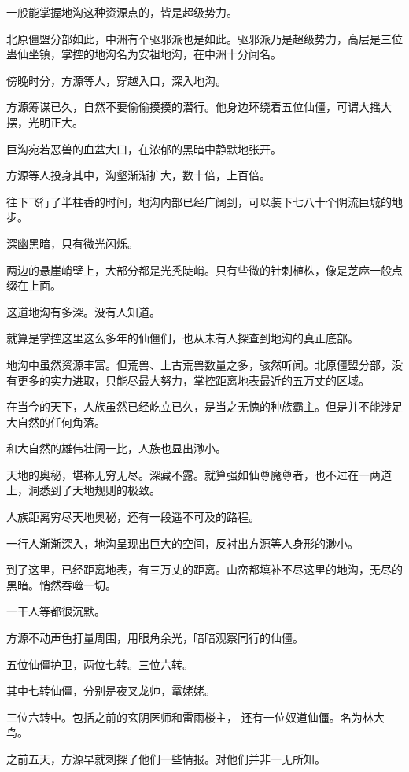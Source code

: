 \begin{this_body}
一般能掌握地沟这种资源点的，皆是超级势力。

北原僵盟分部如此，中洲有个驱邪派也是如此。驱邪派乃是超级势力，高层是三位蛊仙坐镇，掌控的地沟名为安祖地沟，在中洲十分闻名。

傍晚时分，方源等人，穿越入口，深入地沟。

方源筹谋已久，自然不要偷偷摸摸的潜行。他身边环绕着五位仙僵，可谓大摇大摆，光明正大。

巨沟宛若恶兽的血盆大口，在浓郁的黑暗中静默地张开。

方源等人投身其中，沟壑渐渐扩大，数十倍，上百倍。

往下飞行了半柱香的时间，地沟内部已经广阔到，可以装下七八十个阴流巨城的地步。

深幽黑暗，只有微光闪烁。

两边的悬崖峭壁上，大部分都是光秃陡峭。只有些微的针刺植株，像是芝麻一般点缀在上面。

这道地沟有多深。没有人知道。

就算是掌控这里这么多年的仙僵们，也从未有人探查到地沟的真正底部。

地沟中虽然资源丰富。但荒兽、上古荒兽数量之多，骇然听闻。北原僵盟分部，没有更多的实力进取，只能尽最大努力，掌控距离地表最近的五万丈的区域。

在当今的天下，人族虽然已经屹立已久，是当之无愧的种族霸主。但是并不能涉足大自然的任何角落。

和大自然的雄伟壮阔一比，人族也显出渺小。

天地的奥秘，堪称无穷无尽。深藏不露。就算强如仙尊魔尊者，也不过在一两道上，洞悉到了天地规则的极致。

人族距离穷尽天地奥秘，还有一段遥不可及的路程。

一行人渐渐深入，地沟呈现出巨大的空间，反衬出方源等人身形的渺小。

到了这里，已经距离地表，有三万丈的距离。山峦都填补不尽这里的地沟，无尽的黑暗。悄然吞噬一切。

一干人等都很沉默。

方源不动声色打量周围，用眼角余光，暗暗观察同行的仙僵。

五位仙僵护卫，两位七转。三位六转。

其中七转仙僵，分别是夜叉龙帅，鼋姥姥。

三位六转中。包括之前的玄阴医师和雷雨楼主， 还有一位奴道仙僵。名为林大鸟。

之前五天，方源早就刺探了他们一些情报。对他们并非一无所知。


\end{this_body}
